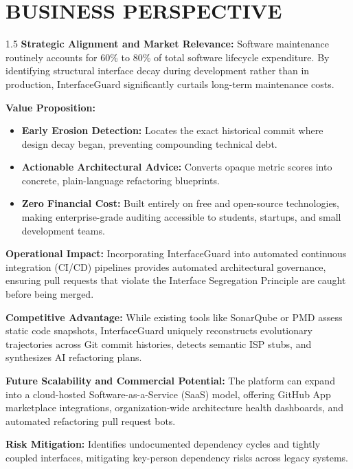 \documentclass[12pt,a4paper]{article}
\begin{document}
\clearpage

\section{BUSINESS PERSPECTIVE}

\begin{spacing}{1.5}
\justifying
\textbf{Strategic Alignment and Market Relevance:} Software maintenance routinely accounts for 60\% to 80\% of total software lifecycle expenditure. By identifying structural interface decay during development rather than in production, InterfaceGuard significantly curtails long-term maintenance costs.

\textbf{Value Proposition:}
\begin{itemize}[leftmargin=*,itemsep=2pt]
  \item \textbf{Early Erosion Detection:} Locates the exact historical commit where design decay began, preventing compounding technical debt.
  \item \textbf{Actionable Architectural Advice:} Converts opaque metric scores into concrete, plain-language refactoring blueprints.
  \item \textbf{Zero Financial Cost:} Built entirely on free and open-source technologies, making enterprise-grade auditing accessible to students, startups, and small development teams.
\end{itemize}

\textbf{Operational Impact:} Incorporating InterfaceGuard into automated continuous integration (CI/CD) pipelines provides automated architectural governance, ensuring pull requests that violate the Interface Segregation Principle are caught before being merged.

\textbf{Competitive Advantage:} While existing tools like SonarQube or PMD assess static code snapshots, InterfaceGuard uniquely reconstructs evolutionary trajectories across Git commit histories, detects semantic ISP stubs, and synthesizes AI refactoring plans.

\textbf{Future Scalability and Commercial Potential:} The platform can expand into a cloud-hosted Software-as-a-Service (SaaS) model, offering GitHub App marketplace integrations, organization-wide architecture health dashboards, and automated refactoring pull request bots.

\textbf{Risk Mitigation:} Identifies undocumented dependency cycles and tightly coupled interfaces, mitigating key-person dependency risks across legacy systems.
\end{spacing}
\end{document}
